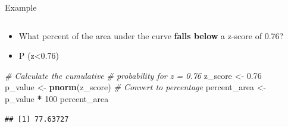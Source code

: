 \documentclass[
  ignorenonframetext,
]{beamer}
\newenvironment{Shaded}{\begin{snugshade}}{\end{snugshade}}
\newcommand{\CommentTok}[1]{\textcolor[rgb]{0.56,0.35,0.01}{\textit{#1}}}
\newcommand{\DecValTok}[1]{\textcolor[rgb]{0.00,0.00,0.81}{#1}}
\newcommand{\FloatTok}[1]{\textcolor[rgb]{0.00,0.00,0.81}{#1}}
\newcommand{\FunctionTok}[1]{\textcolor[rgb]{0.13,0.29,0.53}{\textbf{#1}}}
\newcommand{\NormalTok}[1]{#1}
\newcommand{\OtherTok}[1]{\textcolor[rgb]{0.56,0.35,0.01}{#1}}
\newcommand{\SpecialCharTok}[1]{\textcolor[rgb]{0.81,0.36,0.00}{\textbf{#1}}}
\providecommand{\tightlist}{%
  \setlength{\itemsep}{0pt}\setlength{\parskip}{0pt}}
\begin{document}
\begin{frame}[fragile]{Example}
\label{example-2}
\begin{columns}[T]
\begin{column}{0.5\textwidth}
\vspace{1cm}

\begin{itemize}
\tightlist
\item
  What percent of the area under the curve \textbf{falls below} a
  z-score of 0.76?
\end{itemize}

\begin{itemize}
\tightlist
\item
  P (z\textless0.76)
\end{itemize}

\begin{Shaded}
\begin{Highlighting}[]
\CommentTok{\# Calculate the cumulative }
\CommentTok{\# probability for z = 0.76}
\NormalTok{z\_score }\OtherTok{\textless{}{-}} \FloatTok{0.76}
\NormalTok{p\_value }\OtherTok{\textless{}{-}} \FunctionTok{pnorm}\NormalTok{(z\_score)}
\CommentTok{\# Convert to percentage}
\NormalTok{percent\_area }\OtherTok{\textless{}{-}}\NormalTok{ p\_value }\SpecialCharTok{*} \DecValTok{100}
\NormalTok{percent\_area}
\end{Highlighting}
\end{Shaded}

\begin{verbatim}
## [1] 77.63727
\end{verbatim}
\end{column}

\begin{column}{0.5\textwidth}
\vspace{1cm}


\end{column}
\end{columns}
\end{frame}
\end{document}
